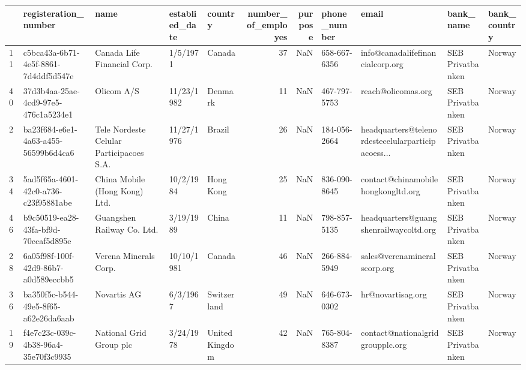 \begin{tabular}{lllllrrllll}
\toprule
{} &                  registeration\_number &                                      name & establied\_date &         country &  number\_of\_employes &  purpose &  phone\_number &                                              email &         bank\_name & bank\_country \\
\midrule
11 &  c5bca43a-6b71-4e5f-8861-7d4ddf5d547e &               Canada Life Financial Corp. &       1/5/1971 &          Canada &                  37 &      NaN &  658-667-6356 &                   info@canadalifefinancialcorp.org &  SEB Privatbanken &       Norway \\
40 &  37d3b4aa-25ae-4cd9-97e5-476c1a5234e1 &                                Olicom A/S &     11/23/1982 &         Denmark &                  11 &      NaN &  467-797-5753 &                                 reach@olicomas.org &  SEB Privatbanken &       Norway \\
2  &  ba23f684-e6e1-4a63-a455-56599b6d4ca6 &  Tele Nordeste Celular Participacoes S.A. &     11/27/1976 &          Brazil &                  26 &      NaN &  184-056-2664 &  headquarters@telenordestecelularparticipacoess... &  SEB Privatbanken &       Norway \\
34 &  5ad5f65a-4601-42c0-a736-c23f95881abe &             China Mobile (Hong Kong) Ltd. &      10/2/1984 &       Hong Kong &                  25 &      NaN &  836-090-8645 &                 contact@chinamobilehongkongltd.org &  SEB Privatbanken &       Norway \\
46 &  b9c50519-ea28-43fa-bf9d-70ccaf5d895e &                Guangshen Railway Co. Ltd. &      3/19/1989 &           China &                  11 &      NaN &  798-857-5135 &             headquarters@guangshenrailwaycoltd.org &  SEB Privatbanken &       Norway \\
28 &  6a05f98f-100f-42d9-86b7-a0d589eccbb5 &                     Verena Minerals Corp. &     10/10/1981 &          Canada &                  46 &      NaN &  266-884-5949 &                       sales@verenamineralscorp.org &  SEB Privatbanken &       Norway \\
36 &  ba350f5c-b544-49e5-8f65-a62e26da6aab &                               Novartis AG &       6/3/1967 &     Switzerland &                  49 &      NaN &  646-673-0302 &                                  hr@novartisag.org &  SEB Privatbanken &       Norway \\
19 &  f4e7c23c-039c-4b38-96a4-35e70f3c9935 &                   National Grid Group plc &      3/24/1978 &  United Kingdom &                  42 &      NaN &  765-804-8387 &                   contact@nationalgridgroupplc.org &  SEB Privatbanken &       Norway \\

\end{tabular}
